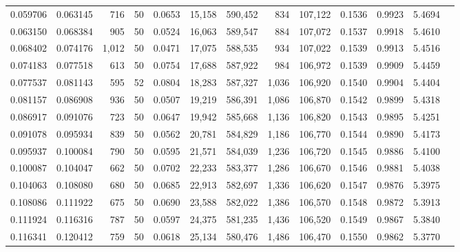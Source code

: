 \begin{tabular}{rrrrrrrrrrrrr}
0.059706 & 0.063145 &   716 &  50 &                                     0.0653 &  15,158 & 590,452 &     834 & 107,122 & 0.1536 & 0.9923 & 5.4694 \\
0.063150 & 0.068384 &   905 &  50 &                                     0.0524 &  16,063 & 589,547 &     884 & 107,072 & 0.1537 & 0.9918 & 5.4610 \\
0.068402 & 0.074176 & 1,012 &  50 &                                     0.0471 &  17,075 & 588,535 &     934 & 107,022 & 0.1539 & 0.9913 & 5.4516 \\
0.074183 & 0.077518 &   613 &  50 &                                     0.0754 &  17,688 & 587,922 &     984 & 106,972 & 0.1539 & 0.9909 & 5.4459 \\
0.077537 & 0.081143 &   595 &  52 &                                     0.0804 &  18,283 & 587,327 &   1,036 & 106,920 & 0.1540 & 0.9904 & 5.4404 \\
0.081157 & 0.086908 &   936 &  50 &                                     0.0507 &  19,219 & 586,391 &   1,086 & 106,870 & 0.1542 & 0.9899 & 5.4318 \\
0.086917 & 0.091076 &   723 &  50 &                                     0.0647 &  19,942 & 585,668 &   1,136 & 106,820 & 0.1543 & 0.9895 & 5.4251 \\
0.091078 & 0.095934 &   839 &  50 &                                     0.0562 &  20,781 & 584,829 &   1,186 & 106,770 & 0.1544 & 0.9890 & 5.4173 \\
0.095937 & 0.100084 &   790 &  50 &                                     0.0595 &  21,571 & 584,039 &   1,236 & 106,720 & 0.1545 & 0.9886 & 5.4100 \\
0.100087 & 0.104047 &   662 &  50 &                                     0.0702 &  22,233 & 583,377 &   1,286 & 106,670 & 0.1546 & 0.9881 & 5.4038 \\
0.104063 & 0.108080 &   680 &  50 &                                     0.0685 &  22,913 & 582,697 &   1,336 & 106,620 & 0.1547 & 0.9876 & 5.3975 \\
0.108086 & 0.111922 &   675 &  50 &                                     0.0690 &  23,588 & 582,022 &   1,386 & 106,570 & 0.1548 & 0.9872 & 5.3913 \\
0.111924 & 0.116316 &   787 &  50 &                                     0.0597 &  24,375 & 581,235 &   1,436 & 106,520 & 0.1549 & 0.9867 & 5.3840 \\
0.116341 & 0.120412 &   759 &  50 &                                     0.0618 &  25,134 & 580,476 &   1,486 & 106,470 & 0.1550 & 0.9862 & 5.3770 \\

\end{tabular}
